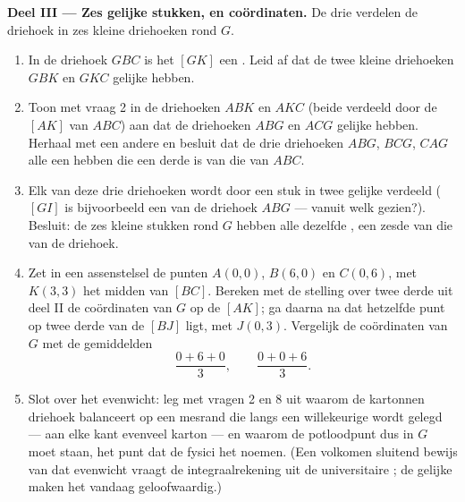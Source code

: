 \begin{problem}
\medskip
\noindent\textbf{Deel III --- Zes gelijke stukken, en coördinaten.}
De drie  verdelen de driehoek in zes kleine driehoeken rond $G$.
\begin{enumerate}[resume]
  \item In de driehoek $GBC$ is het  $[GK]$ een . Leid af dat
        de twee kleine driehoeken $GBK$ en $GKC$ gelijke  hebben.
  \item Toon met vraag 2 in de driehoeken $ABK$ en $AKC$ (beide verdeeld door de
         $[AK]$ van $ABC$) aan dat de driehoeken $ABG$ en $ACG$
        gelijke  hebben. Herhaal met een andere  en besluit
        dat de drie driehoeken $ABG$, $BCG$, $CAG$ alle een  hebben
        die een derde is van die van $ABC$.
  \item Elk van deze drie driehoeken wordt door een stuk  in twee
        gelijke  verdeeld ($[GI]$ is bijvoorbeeld een  van de
        driehoek $ABG$ --- vanuit welk  gezien?). Besluit: de zes kleine
        stukken rond $G$ hebben alle dezelfde , een zesde van die van
        de driehoek.
  \item Zet in een assenstelsel de punten $A(0, 0)$, $B(6, 0)$ en $C(0, 6)$, met
        $K(3, 3)$ het midden van $[BC]$. Bereken met de stelling over twee derde
        uit deel II de coördinaten van $G$ op de  $[AK]$; ga daarna na
        dat hetzelfde punt op twee derde van de  $[BJ]$ ligt, met
        $J(0, 3)$. Vergelijk de coördinaten van $G$ met de gemiddelden
        \[
        \frac{0 + 6 + 0}{3},
        \qquad
        \frac{0 + 0 + 6}{3} .
        \]
  \item Slot over het evenwicht: leg met vragen 2 en 8 uit waarom de kartonnen
        driehoek balanceert op een mesrand die langs een willekeurige 
        wordt gelegd --- aan elke kant evenveel karton --- en waarom de
        potloodpunt dus in $G$ moet staan, het punt dat de fysici het 
        noemen. (Een volkomen sluitend bewijs van dat evenwicht vraagt de
        integraalrekening uit de universitaire ; de gelijke 
        maken het vandaag geloofwaardig.)
\end{enumerate}
\end{problem}
